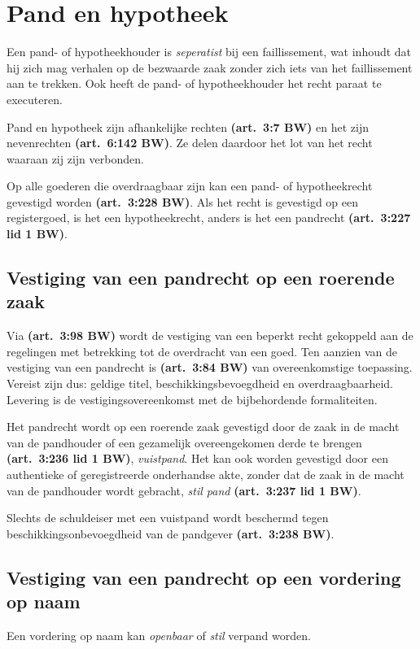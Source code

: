 \documentclass[a4paper]{article}
\newcommand{\art}[1]{\textbf{(art.~#1 BW)}\xspace}
\begin{document}
\section{Pand en hypotheek}

Een pand- of hypotheekhouder is \emph{seperatist} bij een faillissement, wat
inhoudt dat hij zich mag verhalen op de bezwaarde zaak zonder zich iets van
het faillissement aan te trekken. Ook heeft de pand- of hypotheekhouder het
recht paraat te executeren.

Pand en hypotheek zijn afhankelijke rechten \art{3:7} en het zijn nevenrechten
\art{6:142}. Ze delen daardoor het lot van het recht waaraan zij zijn
verbonden.

Op alle goederen die overdraagbaar zijn kan een pand- of hypotheekrecht
gevestigd worden \art{3:228}. Als het recht is gevestigd op een registergoed,
is het een hypotheekrecht, anders is het een pandrecht \art{3:227 lid 1}.

\subsection{Vestiging van een pandrecht op een roerende zaak}

Via \art{3:98} wordt de vestiging van een beperkt recht gekoppeld aan de
regelingen met betrekking tot de overdracht van een goed. Ten aanzien van de
vestiging van een pandrecht is \art{3:84} van overeenkomstige toepassing.
Vereist zijn dus: geldige titel, beschikkingsbevoegdheid en overdraagbaarheid.
Levering is de vestigingsovereenkomst met de bijbehordende formaliteiten.

Het pandrecht wordt op een roerende zaak gevestigd door de zaak in de macht van de
pandhouder of een gezamelijk overeengekomen derde te brengen \art{3:236 lid
1}, \emph{vuistpand}. Het kan ook worden gevestigd door een authentieke of
geregistreerde onderhandse akte, zonder dat de zaak in de macht van de
pandhouder wordt gebracht, \emph{stil pand} \art{3:237 lid 1}.

Slechts de schuldeiser met een vuistpand wordt beschermd tegen
beschikkingsonbevoegdheid van de pandgever \art{3:238}.

\subsection{Vestiging van een pandrecht op een vordering op naam}

Een vordering op naam kan \emph{openbaar} of \emph{stil} verpand worden.
\end{document}
